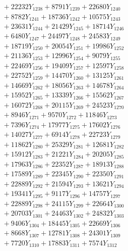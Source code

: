 \documentclass[a4paper,10pt]{article}
\begin{document}
{\begin{align}
&\;  + 22232 Y_{1238} + 8791 Y_{1239} + 22680 Y_{1240} \\[0.3ex]
&\;  + 8782 Y_{1241} + 18736 Y_{1242} + 10575 Y_{1243} \\[0.3ex]
&\;  + 23631 Y_{1244} + 21429 Y_{1245} + 18714 Y_{1246} \\[0.3ex]
&\;  + 6480 Y_{1247} + 24497 Y_{1248} + 24583 Y_{1249} \\[0.3ex]
&\;  + 18719 Y_{1250} + 20054 Y_{1251} + 19986 Y_{1252} \\[0.3ex]
&\;  + 21136 Y_{1253} + 12996 Y_{1254} + 9079 Y_{1255} \\[0.3ex]
&\;  + 22469 Y_{1256} + 19409 Y_{1257} + 12597 Y_{1258} \\[0.5ex]\allowbreak
&\;  + 22752 Y_{1259} + 14470 Y_{1260} + 13125 Y_{1261} \\[0.3ex]
&\;  + 14669 Y_{1262} + 18056 Y_{1263} + 14678 Y_{1264} \\[0.3ex]
&\;  + 15952 Y_{1265} + 13339 Y_{1266} + 15562 Y_{1267} \\[0.3ex]
&\;  + 16072 Y_{1268} + 20115 Y_{1269} + 24523 Y_{1270} \\[0.3ex]
&\;  + 8946 Y_{1271} + 9570 Y_{1272} + 11846 Y_{1273} \\[0.3ex]
&\;  + 7396 Y_{1274} + 17977 Y_{1275} + 17602 Y_{1276} \\[0.3ex]
&\;  + 14027 Y_{1277} + 6914 Y_{1278} + 22723 Y_{1279} \\[0.3ex]
&\;  + 11862 Y_{1280} + 25329 Y_{1281} + 12681 Y_{1282} \\[0.3ex]
&\;  + 15912 Y_{1283} + 21221 Y_{1284} + 20205 Y_{1285} \\[0.3ex]
&\;  + 17963 Y_{1286} + 22352 Y_{1287} + 18913 Y_{1288} \\[0.5ex]\allowbreak
&\;  + 17589 Y_{1289} + 22345 Y_{1290} + 22350 Y_{1291} \\[0.3ex]
&\;  + 22889 Y_{1292} + 21594 Y_{1293} + 13621 Y_{1294} \\[0.3ex]
&\;  + 19341 Y_{1295} + 9117 Y_{1296} + 14757 Y_{1297} \\[0.3ex]
&\;  + 22889 Y_{1298} + 24115 Y_{1299} + 22664 Y_{1300} \\[0.3ex]
&\;  + 20703 Y_{1301} + 24463 Y_{1302} + 24832 Y_{1303} \\[0.3ex]
&\;  + 9406 Y_{1304} + 18445 Y_{1305} + 22669 Y_{1306} \\[0.3ex]
&\;  + 8668 Y_{1307} + 12781 Y_{1308} + 24301 Y_{1309} \\[0.3ex]
&\;  + 7720 Y_{1310} + 17883 Y_{1311} + 7574 Y_{1312} \\[0.3ex]

\end{align}}
\end{document}
